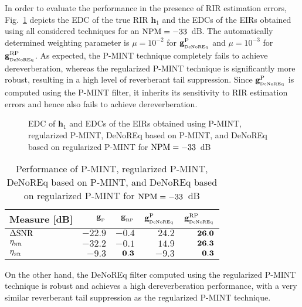 \documentclass{article}
\begin{document}
In order to evaluate the performance in the presence of RIR estimation errors, Fig.~\ref{fig: edc2} depicts the EDC of the true RIR $\mathbf{h}_1$ and the EDCs of the EIRs obtained using all considered techniques for an ${\rm NPM} = -33$~dB.
The automatically determined weighting parameter is $\mu = 10^{-2}$ for $\mathbf{g}_{_{\rm DeNoREq}}^{\rm P}$ and $\mu = 10^{-3}$ for $\mathbf{g}_{_{\rm DeNoREq}}^{\rm RP}$.
As expected, the P-MINT technique completely fails to achieve dereverberation, whereas the regularized P-MINT technique is significantly more robust, resulting in a high level of reverberant tail suppression.
Since $\mathbf{g}_{_{\rm DeNoREq}}^{\rm P}$ is computed using the P-MINT filter, it inherits its sensitivity to RIR estimation errors and hence also fails to achieve dereverberation.
\begin{figure}[t!]
  
  \vspace{-0.22cm}
  \caption{EDC of $\mathbf{h}_1$ and EDCs of the EIRs obtained using P-MINT, regularized P-MINT, DeNoREq based on P-MINT, and DeNoREq based on regularized P-MINT for ${\rm NPM} = -33$~dB}
  \label{fig: edc2}
\end{figure}
\begin{table}[t]
  \vspace{-0.1cm}
\centering
\begin{tabular}{|l|r|r|r|r|}
  \hline
  Measure [dB] & {\footnotesize $\mathbf{g}_{_{\rm P}}$} & {\footnotesize $\mathbf{g}_{_{\rm RP}}$} & {\footnotesize $\mathbf{g}_{_{\rm DeNoREq}}^{\rm P}$} & {\footnotesize $\mathbf{g}_{_{\rm DeNoREq}}^{\rm RP}$} \\
  \hline
  $\Delta {\rm SNR}$ & $-22.9$ & $-0.4$ & $24.2$ & $\bf{26.0}$ \\
  \hline
  $\eta_{_{\rm NR}}$ & $-32.2$ & $-0.1$ & $14.9$ & $\bf{26.3}$ \\
  \hline
  $\eta_{_{\rm SR}}$ & $-9.3$ & $\bf{0.3}$ & $-9.3$ & $\bf{0.3}$ \\
  \hline
\end{tabular}
\vspace{-0.1cm}
\caption{Performance of P-MINT, regularized P-MINT, DeNoREq based on P-MINT, and DeNoREq based on regularized P-MINT for ${\rm NPM} = -33$~dB}
\label{tbl: 2}
\vspace{-0.4cm}
\end{table}
On the other hand, the DeNoREq filter computed using the regularized P-MINT technique is robust and achieves a high dereverberation performance, with a very similar reverberant tail suppression as the regularized P-MINT technique.
\end{document}
